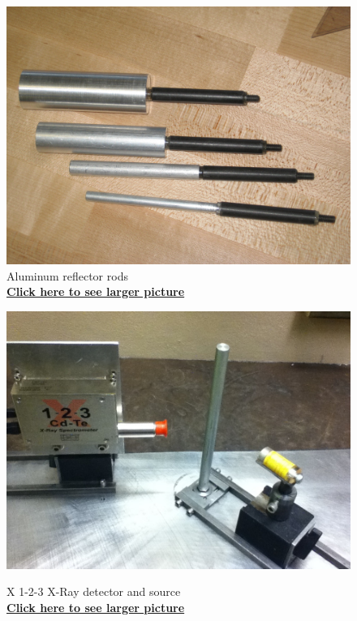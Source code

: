 \documentclass{../lab}
\begin{document}
\begin{figure}[H]
\begin{minipage}{.49\linewidth}
    \centering
    \href{http://experimentationlab.berkeley.edu/sites/default/files/images/Rods_3450.JPG}{\includegraphics[width=\linewidth,keepaspectratio]{images/Rods_3450.JPG}} \\
    \caption{Aluminum reflector rods \\ \href{http://experimentationlab.berkeley.edu/sites/default/files/images/Rods_3450.JPG}{\textbf{Click here to see larger picture}}}
\end{minipage}\hfill
\begin{minipage}{.49\linewidth}
    \centering
    \href{http://experimentationlab.berkeley.edu/sites/default/files/images/COM_3.JPG}{\includegraphics[width=\linewidth,keepaspectratio]{images/COM_3.JPG}} \\
    \caption{X 1-2-3 X-Ray detector and source \\ \href{http://experimentationlab.berkeley.edu/sites/default/files/images/COM_3.JPG}{\textbf{Click here to see larger picture}}}
\end{minipage} 
\end{figure}
\end{document}
